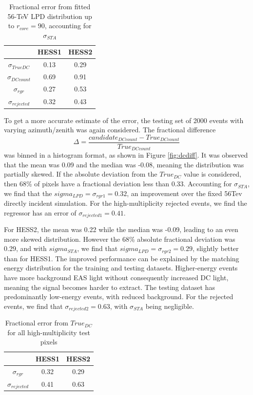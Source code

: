 \documentclass{article}
\begin{document}
\begin{table}[h!]
  \centering
  \caption{Fractional error from fitted 56-TeV LPD distribution up to $r_{core}=90$, accounting for $\sigma_{STA}$}
  \label{tab:lpderror}
  \begin{tabular}{ccc}
    \toprule
    & HESS1 & HESS2\\
    \midrule
    $\sigma_{TrueDC}$ & 0.13 & 0.29\\
    $\sigma_{DCcount}$ & 0.69 & 0.91\\
    $\sigma_{rgr}$ & 0.27 & 0.53\\ 
    $\sigma_{rejected}$ & 0.32 & 0.43\\ 
    \bottomrule
  \end{tabular}
\end{table}

To get a more accurate estimate of the error, the testing set of 2000 events with varying azimuth/zenith was again considered. The fractional difference \[  \Delta = \frac{ candidate_{DC count} - True_{DC count}}{True_{DC count}} \] was binned in a histogram format, as shown in Figure \ref{fig:dcdiff}. It was observed that the mean was 0.09 and the median was -0.08, meaning the distribution was partially skewed. If the absolute deviation from the $True_{DC}$ value is considered, then 68\% of pixels have a fractional deviation less than 0.33. Accounting for $\sigma_{STA}$, we find that the $sigma_{LPD}=\sigma_{rgr1}=0.32$, an improvement over the fixed 56Tev directly incident simulation. For the high-multiplicity rejected events, we find the regressor has an error of $\sigma_{rejected1}=0.41$.

For HESS2, the mean was 0.22 while the median was -0.09, leading to an even more skewed distribution. However the 68\% absolute fractional deviation was 0.29, and with $sigma_{STA}$, we find that $sigma_{LPD}=\sigma_{rgr2}=0.29$, slightly better than for HESS1. The improved performance can be explained by the matching energy distribution for the training and testing datasets. Higher-energy events have more background EAS light without consequently increased DC light, meaning the signal becomes harder to extract. The testing dataset has predominantly low-energy events, with reduced background. For the rejected events, we find that $\sigma_{rejected2}=0.63$, with $\sigma_{STA}$ being negligible.

\begin{table}[h!]
  \centering
  \caption{Fractional error from $True_{DC}$ for all high-multiplicity test pixels}
  \label{tab:altlpderror}
  \begin{tabular}{ccc}
    \toprule
    & HESS1 & HESS2\\
    \midrule
    $\sigma_{rgr}$ & 0.32 & 0.29\\ 
    $\sigma_{rejected}$ & 0.41 & 0.63\\ 
    \bottomrule
  \end{tabular}
\end{table}
\end{document}
